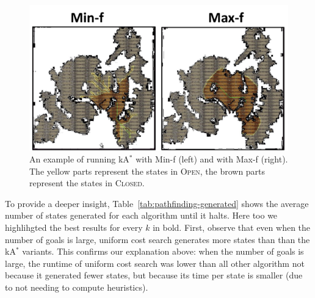 \documentclass{aicom2e}
\newcommand{\kastar}{kA$^*$}
\newcommand{\minf}{Min-f}
\newcommand{\maxf}{Max-f}
\newcommand{\open}{\textsc{Open}}
\newcommand{\closed}{\textsc{Closed}}
\begin{document}

\begin{figure}
	\includegraphics[width=\columnwidth]{min-vs-max}      
	\caption{An example of running \kastar{} with \minf{} (left) and with \maxf{} (right). The yellow parts represent the states in \open{}, the brown parts represent the states in \closed{}.}
	\label{fig:min-vs-max}
\end{figure}

To provide a deeper insight, Table~\ref{tab:pathfinding-generated} shows the average number of states generated for each algorithm until it halts. Here too we highlihgted the best results for every $k$ in bold. 
First, observe that even when the number of goals is large, uniform cost search generates more states than than the \kastar{} variants. This confirms our explanation above: when the number of goals is large, the  runtime of uniform cost search was lower than all other algorithm not because it generated fewer states, but because its time per state is smaller (due to not needing to compute heuristics). 
\end{document}
